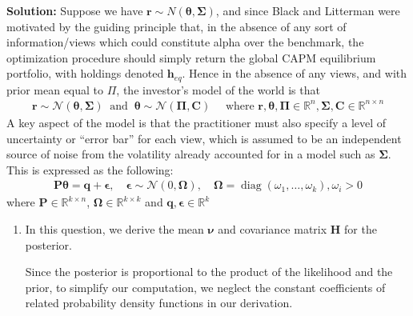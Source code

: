 \documentclass[11pt]{article}
\theoremstyle{plain} %
\newenvironment{solution}
{\color{C2}\normalfont\begin{framed}\begingroup\textbf{Solution:} }
  {\endgroup\end{framed}}
\theoremstyle{remark}
\begin{document}
\begin{solution}
  Suppose we have $\boldsymbol{r} \sim N(\boldsymbol{\theta}, \boldsymbol{\Sigma})$,
  and since Black and Litterman were motivated by
  the guiding principle that, in the absence of any sort of information/views
  which could constitute alpha over the benchmark, the optimization procedure
  should simply return the global CAPM equilibrium portfolio, with holdings
  denoted $\boldsymbol{h}_{e q}$. Hence in the absence of any views, and with
  prior mean equal to $\Pi$, the investor's model of the world is that
  \begin{align}
    \boldsymbol{r} \sim \mathcal{N}(\boldsymbol{\theta}, \boldsymbol{\Sigma}) \  \text { and } \  \boldsymbol{\theta} \sim \mathcal{N}(\boldsymbol{\Pi}, \boldsymbol{C}) \quad \text{ where } \boldsymbol{r}, \boldsymbol{\theta},\boldsymbol{\Pi} \in \mathbb{R}^n, \boldsymbol{\Sigma}, \boldsymbol{C}\in \mathbb{R}^{n\times n}\label{eq:BLB returns}
  \end{align}
  A key aspect of the model is that the practitioner must also specify a level of
  uncertainty or ``error bar'' for each view, which is assumed to be an independent
  source of noise from the volatility already accounted for in a model such as
  $\boldsymbol{\Sigma}$. This is expressed as the following:
  \begin{align}
    \boldsymbol{P} \boldsymbol{\theta}=\boldsymbol{q}+\boldsymbol{\epsilon}, \quad \boldsymbol{\epsilon} \sim \mathcal{N}(0, \boldsymbol{\Omega}), \quad \boldsymbol{\Omega}=\operatorname{diag}\left(\omega_1, \ldots, \omega_k\right), \omega_i > 0 \label{eq:BLB views}
  \end{align}
  where $\boldsymbol{P} \in \mathbb{R}^{k\times n}$, $\boldsymbol{\Omega} \in \mathbb{R}^{k\times k}$ and $\boldsymbol{q},\boldsymbol{\epsilon} \in \mathbb{R}^k$

  \begin{enumerate}[label=(\alph*)]
    \item In this question, we derive the mean $\boldsymbol{\nu}$ and covariance
          matrix $\boldsymbol{H}$ for the posterior.

          Since the posterior is proportional to the product of the likelihood and the
          prior, to simplify our computation, we neglect the constant coefficients of related probability density functions in
          our derivation.


\end{enumerate}
\end{solution}
\end{document}
